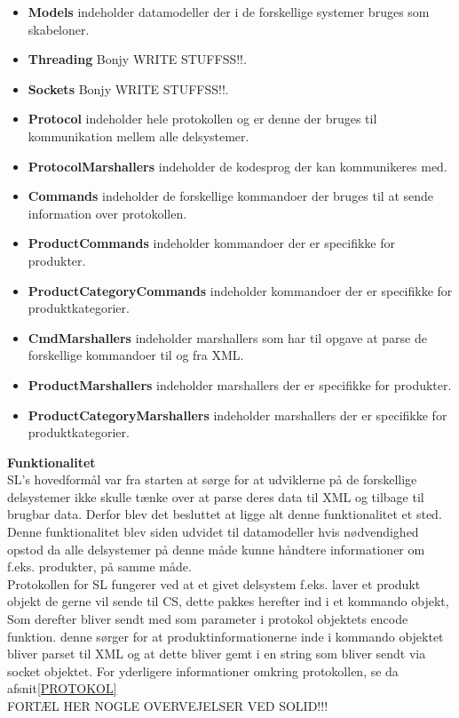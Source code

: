 \begin{itemize}
\item \textbf{Models} indeholder datamodeller der i de forskellige systemer bruges som skabeloner. 
\item \textbf{Threading} Bonjy WRITE STUFFSS!!. 
\item \textbf{Sockets} Bonjy WRITE STUFFSS!!.
\item \textbf{Protocol} indeholder hele protokollen og er denne der bruges til kommunikation mellem alle delsystemer.
\item \textbf{ProtocolMarshallers} indeholder de kodesprog der kan kommunikeres med.
\item \textbf{Commands} indeholder de forskellige kommandoer der bruges til at sende information over protokollen.
\item \textbf{ProductCommands} indeholder kommandoer der er specifikke for produkter.
\item \textbf{ProductCategoryCommands} indeholder kommandoer der er specifikke for produktkategorier.
\item \textbf{CmdMarshallers} indeholder marshallers som har til opgave at parse de forskellige kommandoer til og fra XML.
\item \textbf{ProductMarshallers} indeholder marshallers der er specifikke for produkter.
\item \textbf{ProductCategoryMarshallers} indeholder marshallers der er specifikke for produktkategorier.
\end{itemize}

\textbf{Funktionalitet}\\

\gls{SL}'s hovedformål var fra starten at sørge for at udviklerne på de forskellige delsystemer ikke skulle tænke over at parse deres data til XML og tilbage til brugbar data. Derfor blev det besluttet at ligge alt denne funktionalitet et sted. Denne funktionalitet blev siden udvidet til datamodeller hvis nødvendighed opstod da alle delsystemer på denne måde kunne håndtere informationer om f.eks. produkter, på samme måde.\\

Protokollen for \gls{SL} fungerer ved at et givet delsystem f.eks. laver et produkt objekt de gerne vil sende til \gls{CS}, dette pakkes herefter ind i et kommando objekt, Som derefter bliver sendt med som parameter i protokol objektets encode funktion. denne sørger for at produktinformationerne inde i kommando objektet bliver parset til XML og at dette bliver gemt i en string som bliver sendt via socket objektet. For yderligere informationer omkring protokollen, se da afsnit\ref{PROTOKOL}\\

FORTÆL HER NOGLE OVERVEJELSER VED SOLID!!!\\







